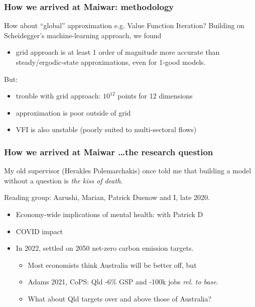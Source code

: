 \documentclass[handout,english]{beamer}
\begin{document}
\begin{frame}
  \frametitle{How we arrived at Maiwar: methodology}
  How about ``global'' approximation e.g. Value Function Iteration?
  Building on Scheidegger's machine-learning approach, we found
  \begin{itemize}
    \item grid approach is at least 1 order of magnitude more accurate than 
      steady/ergodic-state approximations, even for 1-good models.
  \end{itemize}
  But:
  \begin{itemize}
    \item trouble with grid approach: $10 ^ {12}$ points for 12 dimensions
    \item approximation is poor outside of grid
    \item VFI is also unstable (poorly suited to multi-sectoral flows)
  \end{itemize}
\end{frame}
\begin{frame}
  \frametitle{How we arrived at Maiwar \dots the research question}
  My old supervisor (Herakles Polemarchakis) once told me that building a model
  without a question is \emph{the kiss of death}.

  Reading group: Aarushi, Marian, Patrick Duenow and I, late 2020.
  \begin{itemize}
    \item Economy-wide implications of mental health: with Patrick D
    \item COVID impact
    \item In 2022, settled on 2050 net-zero carbon emission targets.
    \begin{itemize}
      \item Most economists think Australia will be better off, but
      \item Adams 2021, CoPS: Qld -6\% GSP and -100k jobs \emph{rel. to base}.
      \item What about Qld targets over and above those of Australia?
    \end{itemize}
  \end{itemize}
\end{frame}
\end{document}
